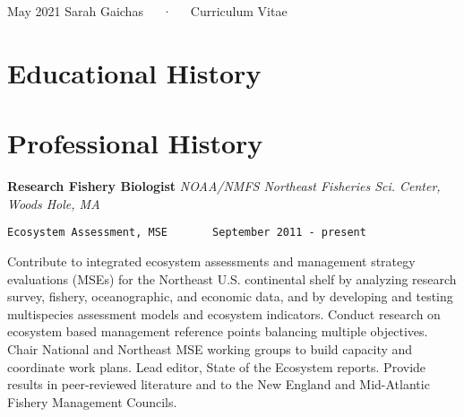 \documentclass[11pt, a4paper]{awesome-cv}
\begin{document}
\makecvheader

\makecvfooter
  {May 2021}
    {Sarah Gaichas~~~·~~~Curriculum Vitae}
  {\thepage}





\hypertarget{educational-history}{%
\section{Educational History}\label{educational-history}}

\begin{cventries}
    \vspace{-4.0mm}
    \vspace{-4.0mm}
    \vspace{-4.0mm}
\end{cventries}

\hypertarget{professional-history}{%
\section{Professional History}\label{professional-history}}

\textbf{Research Fishery Biologist} \emph{NOAA/NMFS Northeast Fisheries
Sci. Center, Woods Hole, MA}

\begin{verbatim}
Ecosystem Assessment, MSE       September 2011 - present
\end{verbatim}

Contribute to integrated ecosystem assessments and management strategy
evaluations (MSEs) for the Northeast U.S. continental shelf by analyzing
research survey, fishery, oceanographic, and economic data, and by
developing and testing multispecies assessment models and ecosystem
indicators. Conduct research on ecosystem based management reference
points balancing multiple objectives. Chair National and Northeast MSE
working groups to build capacity and coordinate work plans. Lead editor,
State of the Ecosystem reports. Provide results in peer-reviewed
literature and to the New England and Mid-Atlantic Fishery Management
Councils.
\end{document}
